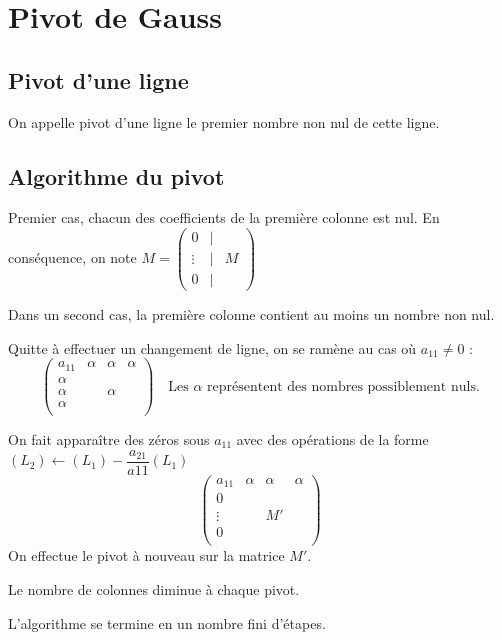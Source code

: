 \documentclass[10pt]{article}
\begin{document}
\section{Pivot de Gauss}
\subsection{Pivot d'une ligne}
\begin{defi}
On appelle pivot d'une ligne le premier nombre non nul de cette ligne. 
\end{defi}

\subsection{Algorithme du pivot}
Premier cas, chacun des coefficients de la première colonne est nul. En conséquence, on note 
$M = \begin{pmatrix} 0 & | &  \\ \vdots & | & M \\ 0 & | &  \end{pmatrix}$ 

Dans un second cas, la première colonne contient au moins un nombre non nul.

 Quitte à effectuer un changement de ligne, on se ramène au cas où $a_{11}\neq 0$ :
 $$
 \left(
 \begin{array}{c|ccc}
 a_{11} & \alpha & \alpha & \alpha \\
\hline
\alpha  & & & \\
\alpha  & & \alpha & \\
\alpha  & & & \\
\end{array}
 \right) \quad 
 \text{Les } \alpha \text{ représentent des nombres possiblement nuls.}
 $$ 

 On fait apparaître des zéros sous $a_{11}$ avec des opérations de la forme $(L_2)\leftarrow (L_1)-\dfrac{a_{21}}{a{11}}(L_1)$ 
 $$
 \left(
 \begin{array}{c|ccc}
 a_{11} & \alpha & \alpha & \alpha \\
\hline
0  & & & \\
\vdots  & & M'& \\
0  & & & \\
\end{array}
 \right) 
 $$ 
 On effectue le pivot  à nouveau sur la matrice $M'$.
 \begin{rem}
 Le nombre de colonnes diminue à chaque pivot.
 
 L'algorithme se termine en un nombre fini d'étapes.
 \end{rem}
\end{document}

